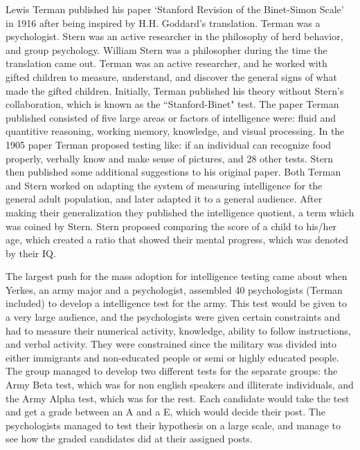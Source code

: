 \documentclass[12pt, oneside]{article}
\begin{document}
\par Lewis Terman published his paper `Stanford Revision of the Binet-Simon Scale' in 1916 after being inspired by H.H. Goddard's translation. Terman was a psychologist. Stern was an active researcher in the philosophy of herd behavior, and group psychology. William Stern was a philosopher during the time the translation came out. Terman was an active researcher, and he worked with gifted children to measure, understand, and discover the general signs of what made the gifted children. Initially, Terman published his theory without Stern's collaboration, which is known as the ``Stanford-Binet" test. The paper Terman published consisted of five large areas or factors of intelligence were: fluid and quantitive reasoning, working memory, knowledge, and visual processing. In the 1905 paper Terman proposed testing like: if an individual can recognize food properly, verbally know and make sense of pictures, and 28 other tests. Stern then published some additional suggestions to his original paper. Both Terman and Stern worked on adapting the system of measuring intelligence for the general adult population, and later adapted it to a general audience. After making their generalization they published the intelligence quotient, a term which was coined by Stern. Stern proposed comparing the score of a child to his/her age, which created a ratio that showed their mental progress, which was denoted by their IQ. 

\par The largest push for the mass adoption for intelligence testing came about when Yerkes, an army major and a psychologist, assembled 40 psychologists (Terman included) to develop a intelligence test for the army. This test would be given to a very large audience, and the psychologists were given certain constraints and had to measure their numerical activity, knowledge, ability to follow instructions, and verbal activity. They were constrained since the military was divided into either immigrants and non-educated people or semi or highly educated people. The group managed to develop two different tests for the separate groups: the Army Beta test, which was for non english speakers and illiterate individuals, and the Army Alpha test, which was for the rest. Each candidate would take the test and get a grade between an A and a E, which would decide their post. The psychologists managed to test their hypothesis on a large scale, and manage to see how the graded candidates did at their assigned posts.
\end{document}
